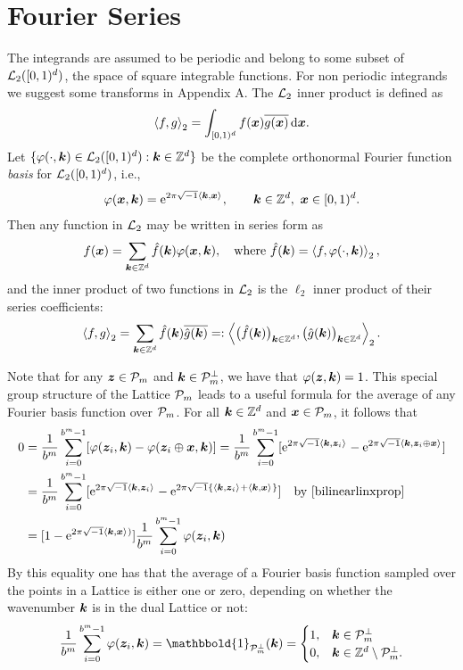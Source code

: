 \documentclass[graybox]{svmult}
\newcommand{\Z}{\mathbb{Z}} %
\newcommand{\bsx}{\boldsymbol{x}}    %
\newcommand{\bsz}{\boldsymbol{z}}    %
\newcommand{\ind}{\mathbbold{1}}
\begin{document}
\section{Fourier Series}\label{secfourierseries}

The integrands are assumed to be periodic and belong to some subset of $\mathcal{L}_2([0,1)^d)$, the space of square integrable functions. For non periodic integrands we suggest some transforms in Appendix A. The $\mathcal{L}_2$ inner product is defined as
\[
\ip[2]{f}{g} = \int_{\cube} f(\bsx) \overline{g(\bsx)} \, \dif \bsx.
\]
Let $\{\varphi(\cdot,\bsk) \in \cl_2(\cube) : \bsk \in \Z^d\}$ be the complete orthonormal Fourier function \emph{basis} for $\mathcal{L}_2([0,1)^d)$, i.e.,
\[
\varphi(\bsx,\bsk)  = \E^{2 \pi \sqrt{-1} \ip{\bsk}{\bsx}}, \qquad \bsk \in \Z^d, \ \bsx \in \cube.
\]
Then any function in $\mathcal{L}_2$ may be written in series form as
\begin{equation} \label{Fourierdef}
f(\bsx) = \sum_{\bsk \in \Z^d} \hf(\bsk) \varphi(\bsx,\bsk), \quad \text{where } \hf(\bsk) = \ip[2]{f}{\varphi(\cdot,\bsk)},
\end{equation}
and the inner product of two functions in $\mathcal{L}_2$ is the $\ell_2$ inner product of their series coefficients:
\[
\ip[2]{f}{g} = \sum_{\bsk \in \Z^d} \hf(\bsk)\overline{\hg(\bsk)} =: \ip[2]{\bigl(\hf(\bsk)\bigr)_{\bsk \in \Z^d}}{\bigl ( \hg(\bsk)\bigr )_{\bsk \in \Z^d}}.
\]

Note that for any $\bsz\in\cp_m$ and $\boldsymbol{k}\in\mathcal{P}_m^\perp$, we have that $\varphi(\bsz,\bsk)=1$. This special group structure of the Lattice $\mathcal{P}_m$ leads to a useful formula for the average of any Fourier basis function over $\mathcal{P}_m$. For all $\bsk \in \Z^d$ and $\bsx \in \cp_m$, it follows that
\begin{align*}
\nonumber
0 & = \frac{1}{b^m} \sum_{i=0}^{b^m-1} [\varphi(\bsz_i,\bsk) - \varphi(\bsz_i \oplus \bsx,\bsk)]
= \frac{1}{b^m} \sum_{i=0}^{b^m-1} [\E^{2 \pi \sqrt{-1} \ip{\bsk}{\bsz_i}} - \E^{2 \pi \sqrt{-1} \ip{\bsk}{\bsz_i \oplus \bsx}}]\\
\nonumber
& = \frac{1}{b^m} \sum_{i=0}^{b^m-1} [\E^{2 \pi \sqrt{-1} \ip{\bsk}{\bsz_i}} - \E^{2 \pi \sqrt{-1} \{\ip{\bsk}{\bsz_i}+\ip{\bsk}{\bsx}\}}] \quad \text{by } \eqref{bilinearlinxprop}\\
\label{sumeq}
& = [1 - \E^{2 \pi \sqrt{-1} \ip{\bsk}{\bsx})}] \frac{1}{b^m} \sum_{i=0}^{b^m-1} \varphi(\bsz_i,\bsk)
\end{align*}
By this equality one has that the average of a Fourier basis function sampled over the points in a Lattice is either one or zero, depending on whether the wavenumber $\boldsymbol{k}$ is in the dual Lattice or not:
\begin{equation}\label{avrFourier}
\frac{1}{b^m} \sum_{i=0}^{b^m-1} \varphi(\bsz_i,\bsk) = \ind_{\cp_m^{\perp}}(\bsk) = \begin{cases} 1 , & \bsk \in \cp_m^{\perp}\\
 0,  & \bsk \in \Z^d \setminus \cp_m^{\perp}.
 \end{cases}
\end{equation}
\end{document}
